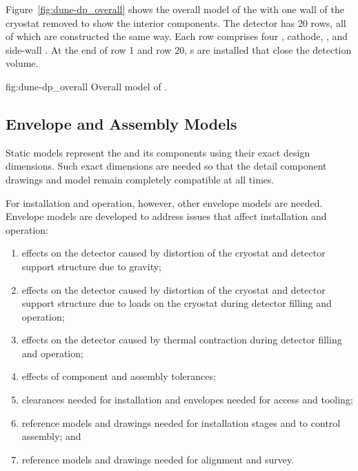 Figure~\ref{fig:dune-dp_overall} shows the overall model of the
 with one wall of the cryostat removed to show the
interior components. The detector has 20 rows, all of which are
constructed the same way. Each row comprises four ,
cathode, ,  and side-wall .  At the
end of row 1 and row 20, \endwall{}s are installed that close the
detection volume.
\begin{dunefigure}{fig:dune-dp_overall}
  {Overall model of  .}
\end{dunefigure}



\subsection{Envelope and Assembly Models}
\label{sec:fdsp-coord-integ-envelope}

Static models represent the  and its components using their exact
design dimensions. Such exact dimensions are needed so that the
detail component drawings and model remain completely compatible at all
times.


For installation and operation, however, other envelope models are
needed. Envelope models are developed to address issues that affect
installation and operation:
\begin{enumerate}
 \item effects on the detector caused by distortion of the cryostat
   and detector support structure due to gravity;
 \item effects on the detector caused by distortion of the cryostat
   and detector support structure due to loads on the cryostat during
   detector filling and operation;
 \item effects on the detector caused by thermal contraction during
   detector filling and operation;
 \item effects of component and
   assembly tolerances;
 \item clearances needed for installation and envelopes needed for
   access and tooling;
 \item reference models and drawings needed for installation stages
   and to control assembly; and
 \item reference models and drawings needed for alignment and survey.
\end{enumerate}


